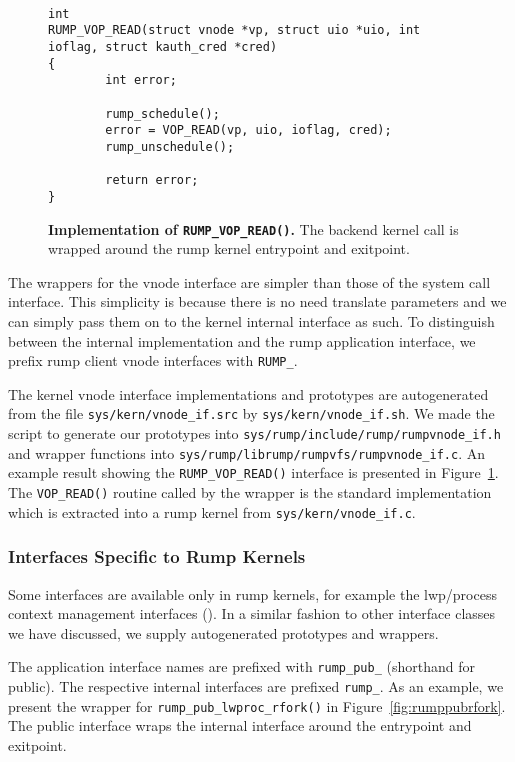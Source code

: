 \begin{figure}[t]
{\tt \scriptsize  
\begin{verbatim}
int
RUMP_VOP_READ(struct vnode *vp, struct uio *uio, int ioflag, struct kauth_cred *cred)
{
        int error;

        rump_schedule();
        error = VOP_READ(vp, uio, ioflag, cred);
        rump_unschedule();

        return error;
}
\end{verbatim}}
\caption[Implementation of \texttt{RUMP\_VOP\_READ()}]{
\textbf{Implementation of \texttt{RUMP\_VOP\_READ()}.}
The backend kernel call is wrapped around the rump kernel entrypoint
and exitpoint.
}
\label{fig:rumpvopread}
\end{figure}

The wrappers for the vnode interface are simpler than those of the
system call interface.  This simplicity is because there is no need translate
parameters and we can simply pass them on to the kernel internal
interface as such.  To distinguish between the internal implementation
and the rump application interface, we prefix rump client vnode
interfaces with \verb+RUMP_+.

The kernel vnode interface implementations and prototypes are
autogenerated from the file \verb+sys/kern/vnode_if.src+ by
\verb+sys/kern/vnode_if.sh+.
We made the script to generate our prototypes into
\verb+sys/rump/include/rump/rumpvnode_if.h+ and wrapper functions
into \verb+sys/rump/librump/rumpvfs/rumpvnode_if.c+.  An example
result showing the \verb+RUMP_VOP_READ()+ interface is presented in
Figure~\ref{fig:rumpvopread}.  The \verb+VOP_READ()+ routine called
by the wrapper is the standard implementation which is extracted
into a rump kernel from \verb+sys/kern/vnode_if.c+.


\subsubsection{Interfaces Specific to Rump Kernels}

Some interfaces are available only in rump kernels, for example the
lwp/process context management interfaces
().  In a similar fashion
to other interface classes we have discussed, we supply autogenerated
prototypes and wrappers.

The application interface names are prefixed with \verb+rump_pub_+
(shorthand for public).  The respective internal interfaces are
prefixed \verb+rump_+.  As an example, we present the wrapper for
\verb+rump_pub_lwproc_rfork()+ in Figure~\ref{fig:rumppubrfork}.
The public interface wraps the internal interface around the entrypoint
and exitpoint.

